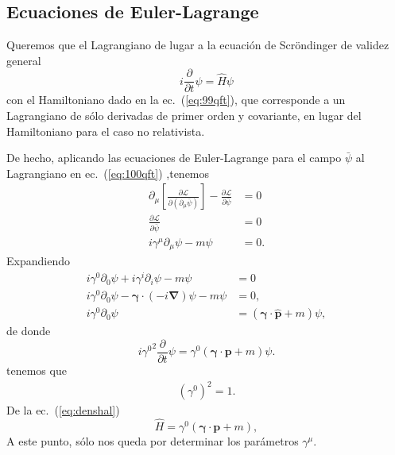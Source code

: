 \subsection{Ecuaciones de Euler-Lagrange}
\label{sec:ecuaciones-de-euler}
Queremos que el Lagrangiano de lugar a la ecuación de Scröndinger de validez general
\begin{equation}
  \label{eq:grlsch}
  i\frac{\partial}{\partial t}\psi=\hat{H} \psi
\end{equation}
con el Hamiltoniano dado en la ec.~(\ref{eq:99qft}), que corresponde a un Lagrangiano de sólo derivadas de primer orden y covariante, en lugar del Hamiltoniano para el caso no relativista. 

De hecho, aplicando las ecuaciones de Euler-Lagrange para el campo $\bar{\psi}$ al Lagrangiano en ec.~(\ref{eq:100qft}) ,tenemos
\begin{align}
  \partial_\mu\left[\frac{\partial\mathcal{L}}{\partial\left(\partial_\mu\bar{\psi}\right)}\right]-\frac{\partial\mathcal{L}}{\partial\bar{\psi}}&=0\nonumber\\
  \frac{\partial\mathcal{L}}{\partial\bar{\psi}}&=0\nonumber\\
  \label{eq:114qftm}
  i\gamma^\mu\partial_\mu\psi-m\psi&=0.
\end{align}
Expandiendo
\begin{align*}
  i\gamma^0\partial_0\psi+i\gamma^i\partial_i\psi-m\psi&=0\\
  i\gamma^0\partial_0\psi-\boldsymbol{\gamma}\cdot(-i\boldsymbol{\nabla})\psi-m\psi&=0,\\
  i\gamma^0\partial_0\psi&=(\boldsymbol{\gamma}\cdot\hat{\mathbf{p}}+m)\psi,
\end{align*}
de donde
\begin{equation}
    i{\gamma^0}^2\frac{\partial}{\partial t}\psi=\gamma^0(\boldsymbol{\gamma}\cdot\mathbf{p}+m)\psi.
\end{equation}
 tenemos que
\begin{align}
  \label{eq:gamma02}
  \left(\gamma^0\right)^2=1.
\end{align}
De la ec.~(\ref{eq:denshal})
\begin{equation}
  \label{eq:186qft}
  \hat{H}= \gamma^0(\boldsymbol{\gamma}\cdot\mathbf{p}+m),
\end{equation}
A este punto, sólo nos queda por determinar los parámetros $\gamma^\mu$. 

